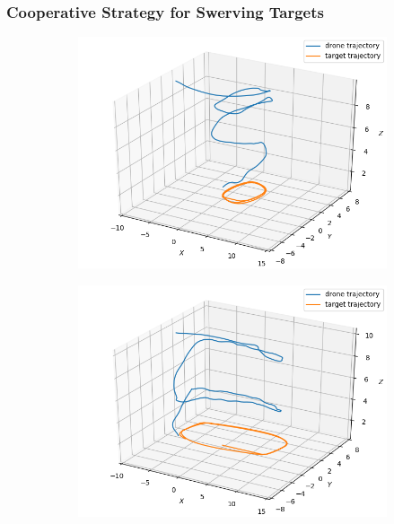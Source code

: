 \documentclass[conf]{new-aiaa}
\begin{document}
\subsubsection{Cooperative Strategy for Swerving Targets}\label{sec:coop1_results}
\begin{figure}[h]
  \begin{subfigure}{0.5\textwidth}
    \includegraphics[width=\linewidth]{square_coord.png}
    \caption{} \label{fig:square_coord}
  \end{subfigure}%
  \hspace*{\fill}   %
  \begin{subfigure}{0.5\textwidth}
    \includegraphics[width=\linewidth]{tight_square_coord.png}

\end{subfigure}
\end{figure}
\end{document}
